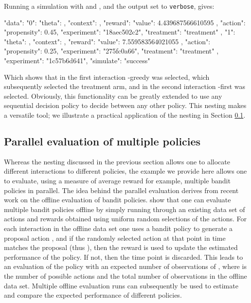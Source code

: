 \documentclass[nojss]{jss}
\begin{document}
Running a simulation with  and , and the output set to \texttt{verbose}, gives:
\begin{Code}
{
    "data": {
        "0": {
            "theta": {},
            "context": {},
            "reward": {
                "value": 4.439687566610595
            },
            "action": {
                "propensity": 0.45,
                "experiment": "18aec502c2",
                "treatment": "treatment"
            }
        },
        "1": {
            "theta": {},
            "context": {},
            "reward": {
                "value": 7.559583564021055
            },
            "action": {
                "propensity": 0.25,
                "experiment": "275fc0a66",
                "treatment": "treatment"
            }
        }
    },
    "experiment": "1c57b6d641",
    "simulate": "success"
}
\end{Code}
Which shows that in the first interaction -greedy was selected, which subsequently selected the treatment arm, and in the second interaction -first was selected. Obviously, this functionality can be greatly extended to use any sequential decision policy to decide between any other policy. This nesting makes  a versatile tool; we illustrate a practical application of the nesting in Section \ref{sec:offpol}.

\subsection{Parallel evaluation of multiple policies}
\label{sec:offpol}

Whereas the nesting discussed in the previous section allows one to allocate different interactions to different policies, the example we provide here allows one to evaluate, using a measure of average reward for example, multiple bandit policies in parallel. The idea behind the parallel evaluation derives from recent work on the offline evaluation of bandit policies. \citet{Li2010a} show that one can evaluate multiple bandit policies offline by simply running through an existing data set of actions and rewards obtained using uniform random selections of the actions. For each interaction  in the offline data set one uses a bandit policy to generate a proposal action , and if the randomly selected action at that point in time matches the proposal (thus ), then the reward is used to update the estimated performance of the policy. If not, then the time point is discarded. This leads to an evaluation of the policy with an expected number of observations of , where  is the number of possible actions and  the total number of observations in the offline data set. Multiple offline evaluation runs can subsequently be used to estimate and compare the expected performance of different policies.
\end{document}
